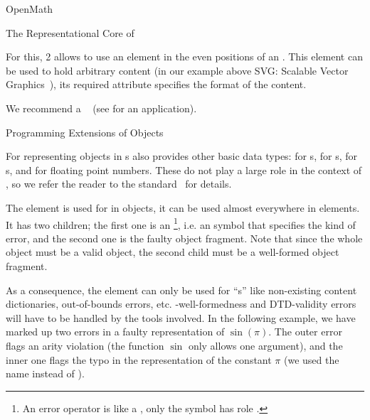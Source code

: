 \begin{omgroup}[id=mobj,short=Mathematical Objects]
\begin{omgroup}[id=openmath]{OpenMath}
\begin{module}[id=OpenMath]
\begin{omgroup}[id=om.core]{The Representational Core of {\openmath}}
\begin{definition}[id=omforeign.def]
  For this, {\openmath}2 allows to use an {} element in the
  even positions of an . This element can be used to hold
  arbitrary {\xml} content (in our example above SVG: Scalable Vector
  Graphics~\cite{W3C:svg02}), its required 
  attribute specifies the format of the content.
\end{definition}

We recommend a {}~\cite{FreBor:MIME96} (see {} for an
application).
\end{omgroup}

\begin{omgroup}[id=om.error]{Programming Extensions of {\openmath} Objects}

\begin{definition}[id=omi.def]
  For representing objects in {s} {\openmath} also
  provides other basic data types: {} for {s},
  {} for {s}, {} for
  {s}, and {} for floating point numbers. These do
  not play a large role in the context of \omdoc, so we refer the reader to the
  {\openmath} standard~\cite{BusCapCar:2oms04} for details.
\end{definition}

\begin{definition}[id=ome.def]
  The {} element is used for {} in
  {\openmath} objects, it can be used almost everywhere in {\openmath} elements. It has
  two children; the first one is an {}\footnote{An error operator
    is like a {}, only the symbol has role
    .}, i.e. an {\openmath} symbol that specifies the kind
  of error, and the second one is the faulty {\openmath} object fragment. Note that since
  the whole object must be a valid {\openmath} object, the second child must be a
  well-formed {\openmath} object fragment.
\end{definition}
As a consequence, the  element can only be used for
``{s}'' like non-existing content dictionaries, out-of-bounds
errors, etc.  {\xml}-well-formedness and DTD-validity errors will have to be handled by
the {\xml} tools involved. In the following example, we have marked up two errors in a
faulty representation of $\sin(\pi)$.  The outer error flags an arity violation (the
function $\sin$ only allows one argument), and the inner one flags the typo in the
representation of the constant $\pi$ (we used the name {} instead of
{}).


\end{omgroup}
\end{module}
\end{omgroup}
\end{omgroup}

